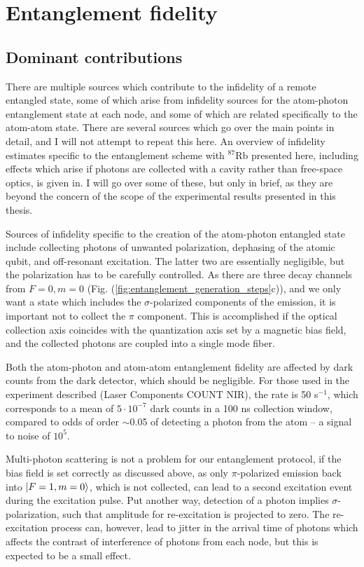 \section{Entanglement fidelity}

\subsection{Dominant contributions}

There are multiple sources which contribute to the infidelity of a remote entangled state, some of which arise from infidelity sources for the atom-photon entanglement state at each node, and some of which are related specifically to the atom-atom state. There are several sources which go over the main points in detail, and I will not attempt to repeat this here. An overview of infidelity estimates specific to the entanglement scheme with $^{87}$Rb presented here, including effects which arise if photons are collected with a cavity rather than free-space optics, is given in\cite{Young2022}. I will go over some of these, but only in brief, as they are beyond the concern of the scope of the experimental results presented in this thesis.

Sources of infidelity specific to the creation of the atom-photon entangled state include collecting photons of unwanted polarization, dephasing of the atomic qubit, and off-resonant excitation. The latter two are essentially negligible, but the polarization has to be carefully controlled. As there are three decay channels from $F=0, m=0$ (Fig. (\ref{fig:entanglement_generation_steps}c)), and we only want a state which includes the $\sigma$-polarized components of the emission, it is important not to collect the $\pi$ component. This is accomplished if the optical collection axis coincides with the quantization axis set by a magnetic bias field, and the collected photons are coupled into a single mode fiber.

Both the atom-photon and atom-atom entanglement fidelity are affected by dark counts from the dark detector, which should be negligible. For those used in the experiment described (Laser Components COUNT NIR), the rate is 50 s$^{-1}$, which corresponds to a mean of $5\cdot 10^{-7}$ dark counts in a 100 ns collection window, compared to odds of order $\sim$0.05 of detecting a photon from the atom -- a signal to noise of $10^5$.

Multi-photon scattering is not a problem for our entanglement protocol, if the bias field is set correctly as discussed above, as only $\pi$-polarized emission back into $\ket{F=1,m=0}$, which is not collected, can lead to a second excitation event during the excitation pulse. Put another way, detection of a photon implies $\sigma$-polarization, such that amplitude for re-excitation is projected to zero. The re-excitation process can, however, lead to jitter in the arrival time of photons which affects the contrast of interference of photons from each node, but this is expected to be a small effect.

